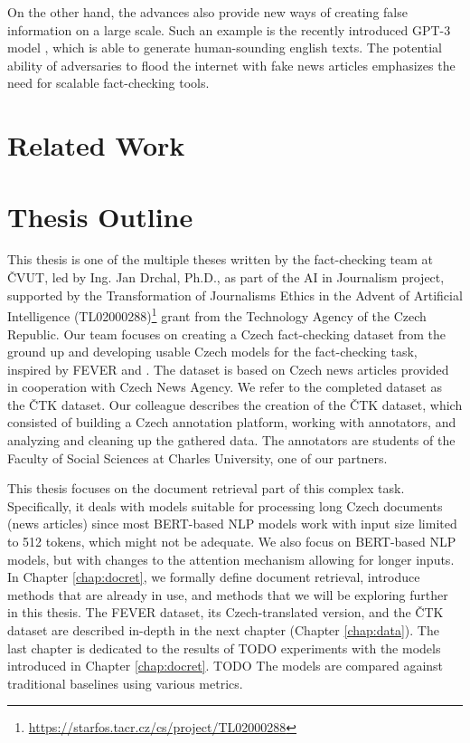 On the other hand, the advances also provide new ways of creating false information on a large scale. Such an example is the recently introduced GPT-3 model \citep{gpt}, which is able to generate human-sounding english texts.
The potential ability of adversaries to flood the internet with fake news articles emphasizes the need for scalable fact-checking tools.

\section*{Related Work}
\section*{Thesis Outline}

This thesis is one of the multiple theses written by the fact-checking team at ČVUT, led by Ing. Jan Drchal, Ph.D., as part of the AI in Journalism project, supported by the Transformation of Journalisms Ethics in the Advent of Artificial Intelligence (TL02000288)\footnote{\url{https://starfos.tacr.cz/cs/project/TL02000288}} grant from the Technology Agency of the Czech Republic.
Our team focuses on creating a Czech fact-checking dataset from the ground up and developing usable Czech models for the fact-checking task, inspired by FEVER and \citet{danish_fever}.
The dataset is based on Czech news articles provided in cooperation with Czech News Agency.
We refer to the completed dataset as the ČTK dataset. 
Our colleague \citet{ullrich} describes the creation of the ČTK dataset, which consisted of building a Czech annotation platform, working with annotators, and analyzing and cleaning up the gathered data.
The annotators are students of the Faculty of Social Sciences at Charles University, one of our partners.

This thesis focuses on the document retrieval part of this complex task.
Specifically, it deals with models suitable for processing long Czech documents (news articles) since most BERT-based NLP models work with input size limited to 512 tokens, which might not be adequate.
We also focus on BERT-based NLP models, but with changes to the attention mechanism allowing for longer inputs.
In Chapter \ref{chap:docret}, we formally define document retrieval, introduce methods that are already in use, and methods that we will be exploring further in this thesis. 
The FEVER dataset, its Czech-translated version, and the ČTK dataset are described in-depth in the next chapter (Chapter \ref{chap:data}).
The last chapter is dedicated to the results of TODO experiments with the models introduced in Chapter \ref{chap:docret}.
TODO The models are compared against traditional baselines using various metrics.